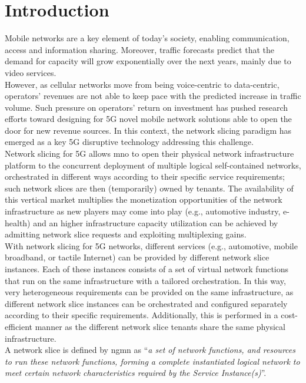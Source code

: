 \documentclass{report}
\begin{document}
\section{Introduction}
Mobile networks are a key element of today's society, enabling communication, access
and information sharing. Moreover, traffic forecasts predict that the
demand for capacity will grow exponentially over the next years, mainly due to
video services. \\
However, as cellular networks move from being voice-centric to
data-centric, operators' revenues are not able to keep pace with the predicted
increase in traffic volume. Such pressure on operators' return on investment has
pushed research efforts toward designing for 5G novel mobile network solutions
able to open the door for new revenue sources. In this context, the network
slicing paradigm has emerged as a key 5G disruptive technology addressing this
challenge.\\
Network slicing for 5G allows \gls{mno} to open
their physical network infrastructure platform to the concurrent deployment
of multiple logical self-contained networks, orchestrated in different ways according
to their specific service requirements; such network slices are then
(temporarily) owned by tenants. The availability of this vertical market multiplies
the monetization opportunities of the network infrastructure as new
players may come into play (e.g., automotive industry, e-health) and an higher
infrastructure capacity utilization can be achieved by admitting network slice
requests and exploiting multiplexing gains.\\
With network slicing for 5G networks, different services (e.g., automotive,
mobile broadband, or tactile Internet) can be provided by different network slice
instances. Each of these instances consists of a set of virtual network functions
that run on the same infrastructure with a tailored orchestration. In this way,
very heterogeneous requirements can be provided on the same infrastructure, as
different network slice instances can be orchestrated and configured separately
according to their specific requirements. Additionally, this is performed in a
cost-efficient manner as the different network slice tenants share the same
physical infrastructure.\\
A network slice is defined by \gls{ngmn} as “\textit{a set of network functions, and
resources to run these network functions, forming a complete instantiated
logical network to meet certain network characteristics required by the Service
Instance(s)}”.\\
\end{document}
